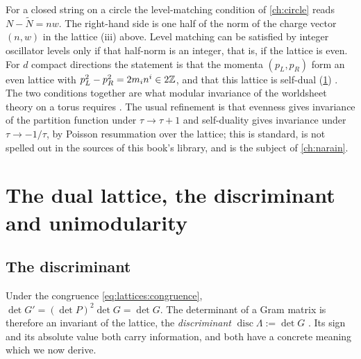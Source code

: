 \begin{physicsbox}
For a closed string on a circle the level-matching condition of \cref{ch:circle} reads
$N-\tilde N=nw$. The right-hand side is one half of the norm of the charge vector
$(n,w)$ in the lattice (iii) above. Level matching can be satisfied by integer oscillator
levels only if that half-norm is an integer, that is, if the lattice is even. For $d$ compact
directions the statement is that the momenta $(p_L,p_R)$ form an even lattice with
$p_L^2-p_R^2=2m_in^i\in2\mathbb{Z}$, and that this lattice is self-dual
(\cref{sec:lattices:dual}) . The two conditions together
are what modular invariance of the worldsheet theory on a torus requires
. The usual refinement is that evenness gives invariance
of the partition function under $\tau\to\tau+1$ and self-duality gives invariance under
$\tau\to-1/\tau$, by Poisson resummation over the lattice; this is standard, is not spelled
out in the sources of this book's library, and is the subject of \cref{ch:narain}.
\end{physicsbox}

\section{The dual lattice, the discriminant and unimodularity}\label{sec:lattices:dual}

\subsection{The discriminant}
Under the congruence \eqref{eq:lattices:congruence},
$\det G'=(\det P)^2\det G=\det G$. The determinant of a Gram matrix is therefore an invariant
of the lattice, the \emph{discriminant}
$\operatorname{disc}\Lambda:=\det G$ . Its sign and its
absolute value both carry information, and both have a concrete meaning which we now derive.


